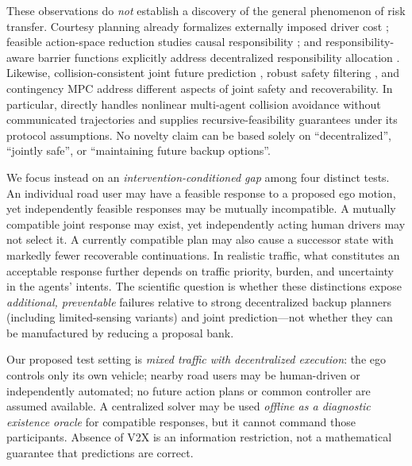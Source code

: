 \documentclass[10pt]{article}
\begin{document}
These observations do \emph{not} establish a discovery of the general phenomenon of risk transfer. Courtesy planning already formalizes externally imposed driver cost \parencite{sun2018courteous}; feasible action-space reduction studies causal responsibility \parencite{george2023feasible}; and responsibility-aware barrier functions explicitly address decentralized responsibility allocation \parencite{cosner2023responsibility}. Likewise, collision-consistent joint future prediction \parencite{luo2023jfp}, robust safety filtering \parencite{ames2017cbf}, and contingency MPC \parencite{studt2026decentralized,studt2026limitedsensing} address different aspects of joint safety and recoverability. In particular, \textcite{studt2026decentralized} directly handles nonlinear multi-agent collision avoidance without communicated trajectories and supplies recursive-feasibility guarantees under its protocol assumptions. No novelty claim can be based solely on ``decentralized'', ``jointly safe'', or ``maintaining future backup options''.

We focus instead on an \emph{intervention-conditioned gap} among four distinct tests. An individual road user may have a feasible response to a proposed ego motion, yet independently feasible responses may be mutually incompatible. A mutually compatible joint response may exist, yet independently acting human drivers may not select it. A currently compatible plan may also cause a successor state with markedly fewer recoverable continuations. In realistic traffic, what constitutes an acceptable response further depends on traffic priority, burden, and uncertainty in the agents' intents. The scientific question is whether these distinctions expose \emph{additional, preventable} failures relative to strong decentralized backup planners (including limited-sensing variants) and joint prediction---not whether they can be manufactured by reducing a proposal bank.

Our proposed test setting is \emph{mixed traffic with decentralized execution}: the ego controls only its own vehicle; nearby road users may be human-driven or independently automated; no future action plans or common controller are assumed available. A centralized solver may be used \emph{offline as a diagnostic existence oracle} for compatible responses, but it cannot command those participants. Absence of V2X is an information restriction, not a mathematical guarantee that predictions are correct.
\end{document}
